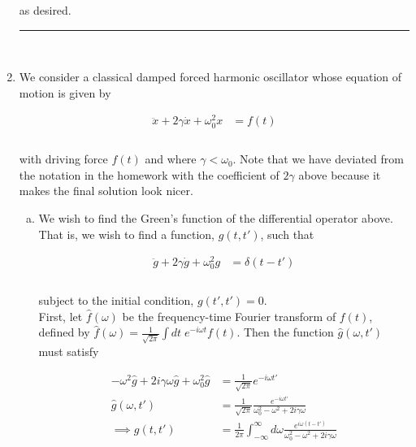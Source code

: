 \documentclass[]{article}
\begin{document}
\begin{enumerate}[1)]
as desired. \\


\noindent\rule{15cm}{0.4pt} \\




\item We consider a classical damped forced harmonic oscillator whose equation of motion is given by

\begin{equation}
\begin{aligned}
\ddot{x} + 2 \gamma \dot{x} + \omega_0^2 x & = f(t) \\
\end{aligned}
\end{equation} \\

with driving force $f(t)$ and where $\gamma < \omega_0$. Note that we have deviated from the notation in the homework with the coefficient of $2\gamma$ above because it makes the final solution look nicer.  \\

\begin{enumerate}[a)]

\item We wish to find the Green's function of the differential operator above. That is, we wish to find a function, $g(t,t')$, such that

\begin{equation}
\begin{aligned}
\ddot{g} + 2 \gamma \dot{g} + \omega_0^2 g & = \delta(t - t')  \\
\end{aligned}
\end{equation} \\

subject to the initial condition, $g(t',t')=0$. \\ 

First, let $\hat{f}(\omega)$ be the frequency-time Fourier transform of $f(t)$, defined by $\hat{f}(\omega) = \frac{1}{\sqrt{2\pi}} \int  dt \; e^{-i\omega t} f(t) $. Then the function $\hat{g}(\omega,t')$ must satisfy

\begin{equation}
\begin{aligned}
- \omega^2 \hat{g} + 2  i \gamma \omega \hat{g} + \omega_0^2 \hat{g} & = \frac{1}{\sqrt{2\pi}} e^{ - i \omega t' }  \\
\hat{g}(\omega, t') & = \frac{1}{\sqrt{2\pi}} \frac{ e^{ - i \omega t' }  }{ \omega_0^2 - \omega^2  + 2 i \gamma \omega   } \\
\implies g(t,t') & = \frac{1}{2 \pi } \int_{-\infty}^{\infty} d\omega   \frac{ e^{  i \omega(t- t') }  }{ \omega_0^2 - \omega^2  + 2 i \gamma \omega   }  \\
\end{aligned}
\end{equation} \\


\end{enumerate}
\end{enumerate}
\end{document}
